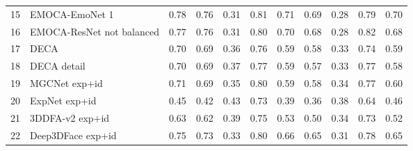 \begin{tabular}{llrrrrrrrrr}
15 &             EMOCA-EmoNet 1 &   0.78 &   0.76 &    0.31 &    0.81 &   0.71 &   0.69 &    0.28 &    0.79 &      0.70 \\
16 &  EMOCA-ResNet not balanced &   0.77 &   0.76 &    0.31 &    0.80 &   0.70 &   0.68 &    0.28 &    0.82 &      0.68 \\
17 &                       DECA &   0.70 &   0.69 &    0.36 &    0.76 &   0.59 &   0.58 &    0.33 &    0.74 &      0.59 \\
18 &                DECA detail &   0.70 &   0.69 &    0.37 &    0.77 &   0.59 &   0.57 &    0.33 &    0.77 &      0.58 \\
19 &              MGCNet exp+id &   0.71 &   0.69 &    0.35 &    0.80 &   0.59 &   0.58 &    0.34 &    0.77 &      0.60 \\
20 &              ExpNet exp+id &   0.45 &   0.42 &    0.43 &    0.73 &   0.39 &   0.36 &    0.38 &    0.64 &      0.46 \\
21 &            3DDFA-v2 exp+id &   0.63 &   0.62 &    0.39 &    0.75 &   0.53 &   0.50 &    0.34 &    0.73 &      0.52 \\
22 &          Deep3DFace exp+id &   0.75 &   0.73 &    0.33 &    0.80 &   0.66 &   0.65 &    0.31 &    0.78 &      0.65 \\
\bottomrule
\end{tabular}
